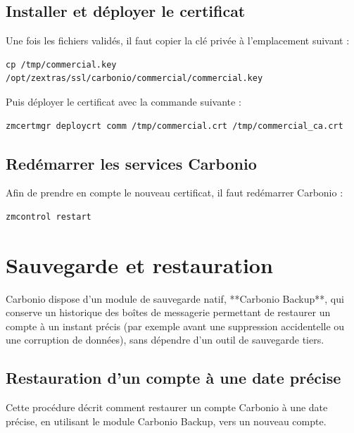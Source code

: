 \documentclass[11pt,a4paper]{report}
\begin{document}
\section{Installer et déployer le certificat}
Une fois les fichiers validés, il faut copier la clé privée à l'emplacement suivant :

\begin{lstlisting}
cp /tmp/commercial.key /opt/zextras/ssl/carbonio/commercial/commercial.key
\end{lstlisting}
Puis déployer le certificat avec la commande suivante :

\begin{lstlisting}
zmcertmgr deploycrt comm /tmp/commercial.crt /tmp/commercial_ca.crt

\end{lstlisting}


\section{Redémarrer les services Carbonio}
Afin de prendre en compte le nouveau certificat, il faut redémarrer Carbonio :

\begin{lstlisting}
zmcontrol restart
\end{lstlisting}


\chapter{Sauvegarde et restauration}

Carbonio dispose d'un module de sauvegarde natif, **Carbonio Backup**,
qui conserve un historique des boîtes de messagerie permettant de
restaurer un compte à un instant précis (par exemple avant une
suppression accidentelle ou une corruption de données), sans dépendre
d'un outil de sauvegarde tiers.\allowbreak{}


\section{Restauration d'un compte à une date précise}
Cette procédure décrit comment restaurer un compte Carbonio à une date précise, en utilisant le module Carbonio Backup, vers un nouveau compte.\allowbreak{}
\end{document}
